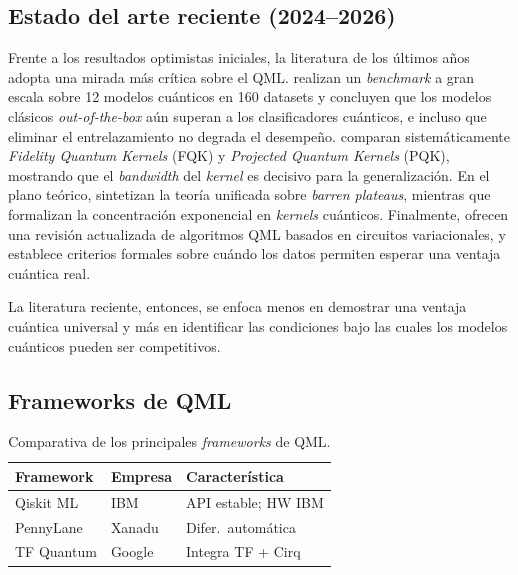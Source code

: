 \subsection{Estado del arte reciente (2024--2026)}

Frente a los resultados optimistas iniciales, la literatura
de los \'ultimos a\~nos adopta una mirada m\'as cr\'itica sobre el
QML. \citet{bowles2024} realizan un \textit{benchmark} a gran escala
sobre 12 modelos cu\'anticos en 160 datasets y concluyen que los
modelos cl\'asicos \emph{out-of-the-box} a\'un superan a los
clasificadores cu\'anticos, e incluso que eliminar el entrelazamiento
no degrada el desempe\~no. \citet{schnabel2024} comparan
sistem\'aticamente \textit{Fidelity Quantum Kernels} (FQK) y
\textit{Projected Quantum Kernels} (PQK), mostrando que el
\textit{bandwidth} del \textit{kernel} es decisivo para la
generalizaci\'on. En el plano te\'orico, \citet{larocca2025} sintetizan
la teor\'ia unificada sobre \textit{barren plateaus}, mientras que
\citet{thanasilp2024} formalizan la concentraci\'on exponencial en
\textit{kernels} cu\'anticos. Finalmente, \citet{yu2025} ofrecen una
revisi\'on actualizada de algoritmos QML basados en circuitos
variacionales, y \citet{huang2021} establece criterios formales sobre
cu\'ando los datos permiten esperar una ventaja cu\'antica real.

\noindent La literatura reciente, entonces, se enfoca menos en demostrar
una ventaja cu\'antica universal y m\'as en identificar las condiciones
bajo las cuales los modelos cu\'anticos pueden ser competitivos.

\subsection{Frameworks de QML}

\begin{table}[H]
\centering
\caption{Comparativa de los principales \textit{frameworks} de QML.}
\label{tab:frameworks}
\small
\begin{tabular}{@{}lll@{}}
\toprule
\textbf{Framework} & \textbf{Empresa} & \textbf{Caracter\'istica} \\
\midrule
Qiskit ML       & IBM     & API estable; HW IBM   \\
PennyLane       & Xanadu  & Difer.\ autom\'atica  \\
TF Quantum      & Google  & Integra TF + Cirq     \\
\bottomrule
\end{tabular}
\end{table}

